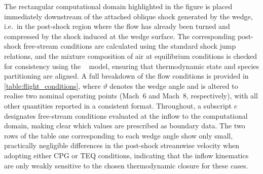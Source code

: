 The rectangular computational domain highlighted in the figure is placed immediately downstream of the attached oblique shock generated by the wedge, i.e.\ in the post-shock region where the flow has already been turned and compressed by the shock induced at the wedge surface. The corresponding post-shock free-stream conditions are calculated using the standard shock jump relations, and the mixture composition of air at equilibrium conditions is checked for consistency using the ~\cite{Park1990} model, ensuring that thermodynamic state and species partitioning are aligned. A full breakdown of the flow conditions is provided in \cref{table:flight_conditions}, where $\vartheta$ denotes the wedge angle and is altered to realise two nominal operating points (Mach~6 and Mach~8, respectively), with all other quantities reported in a consistent format. Throughout, a subscript $e$ designates free-stream conditions evaluated at the inflow to the computational domain, making clear which values are prescribed as boundary data. The two rows of the table one corresponding to each wedge angle show only small, practically negligible differences in the post-shock streamwise velocity when adopting either \gls{CPG} or \gls{TEQ} conditions, indicating that the inflow kinematics are only weakly sensitive to the chosen thermodynamic closure for these cases.




